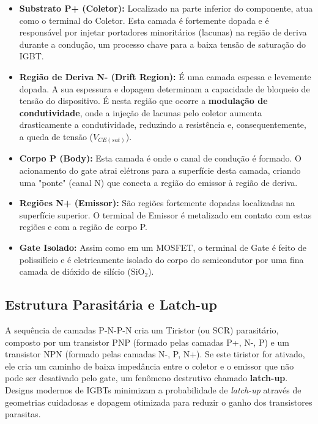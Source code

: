 \documentclass[12pt]{article}
\begin{document}
        \begin{itemize}
            \item \textbf{Substrato P+ (Coletor):} Localizado na parte inferior do componente, atua como o terminal do Coletor. Esta camada é fortemente dopada e é responsável por injetar portadores minoritários (lacunas) na região de deriva durante a condução, um processo chave para a baixa tensão de saturação do IGBT.
            \item \textbf{Região de Deriva N- (Drift Region):} É uma camada espessa e levemente dopada. A sua espessura e dopagem determinam a capacidade de bloqueio de tensão do dispositivo. É nesta região que ocorre a \textbf{modulação de condutividade}, onde a injeção de lacunas pelo coletor aumenta drasticamente a condutividade, reduzindo a resistência e, consequentemente, a queda de tensão ($V_{CE(sat)}$).
            \item \textbf{Corpo P (Body):} Esta camada é onde o canal de condução é formado. O acionamento do gate atrai elétrons para a superfície desta camada, criando uma "ponte" (canal N) que conecta a região do emissor à região de deriva.
            \item \textbf{Regiões N+ (Emissor):} São regiões fortemente dopadas localizadas na superfície superior. O terminal de Emissor é metalizado em contato com estas regiões e com a região de corpo P.
            \item \textbf{Gate Isolado:} Assim como em um MOSFET, o terminal de Gate é feito de polissilício e é eletricamente isolado do corpo do semicondutor por uma fina camada de dióxido de silício ($\text{SiO}_2$).
        \end{itemize}

        \subsection{Estrutura Parasitária e Latch-up} A sequência de camadas P-N-P-N cria um Tiristor (ou SCR) parasitário, composto por um transistor PNP (formado pelas camadas P+, N-, P) e um transistor NPN (formado pelas camadas N-, P, N+). Se este tiristor for ativado, ele cria um caminho de baixa impedância entre o coletor e o emissor que não pode ser desativado pelo gate, um fenômeno destrutivo chamado \textbf{latch-up}. Designs modernos de IGBTs minimizam a probabilidade de \textit{latch-up} através de geometrias cuidadosas e dopagem otimizada para reduzir o ganho dos transistores parasitas.
\end{document}

